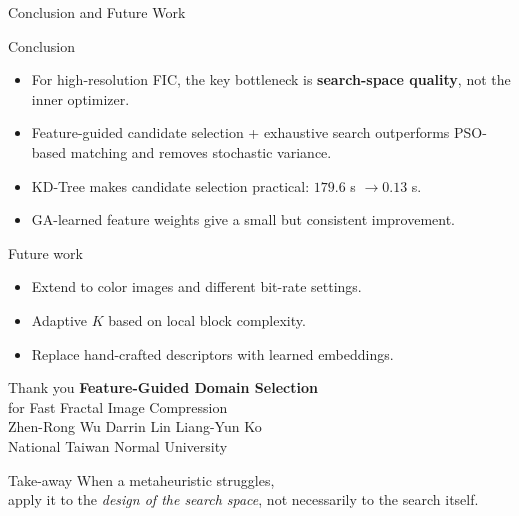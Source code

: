 \documentclass[10pt,aspectratio=169]{beamer}
\begin{document}
\begin{frame}{Conclusion and Future Work}
  \begin{block}{Conclusion}
    \begin{itemize}
      \item For high-resolution FIC, the key bottleneck is \textbf{search-space quality},
            not the inner optimizer.
      \item Feature-guided candidate selection + exhaustive search outperforms PSO-based
            matching and removes stochastic variance.
      \item KD-Tree makes candidate selection practical: $179.6$ s $\to 0.13$ s.
      \item GA-learned feature weights give a small but consistent improvement.
    \end{itemize}
  \end{block}
  \begin{exampleblock}{Future work}
    \begin{itemize}
      \item Extend to color images and different bit-rate settings.
      \item Adaptive $K$ based on local block complexity.
      \item Replace hand-crafted descriptors with learned embeddings.
    \end{itemize}
  \end{exampleblock}
\end{frame}

\begin{frame}{Thank you}
  \centering
  \vspace{0.8cm}
  {\Large\color{ntnured}\textbf{Feature-Guided Domain Selection}}\\[2pt]
  {\large for Fast Fractal Image Compression}\\[0.6cm]
  Zhen-Rong Wu \quad Darrin Lin \quad Liang-Yun Ko\\[0.3cm]
  {\small National Taiwan Normal University}\\[0.6cm]
  \begin{block}{Take-away}
    \centering
    When a metaheuristic struggles,\\
    apply it to the \emph{design of the search space},    not necessarily to the search itself.
  \end{block}
\end{frame}
\end{document}
